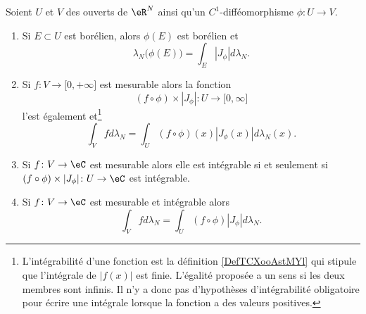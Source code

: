 \begin{theorem}
    Soient \( U\) et \( V\) des ouverts de \( \eR^N\) ainsi qu'un \( C^1\)-difféomorphisme \(\phi\colon U\to V\).
    \begin{enumerate}
        \item   \label{ItemVWYDooOzwnyfi}
            Si \( E\subset U\) est borélien, alors \( \phi(E)\) est borélien et
            \begin{equation}
                \lambda_N\big( \phi(E) \big)=\int_E| J_{\phi} |d\lambda_N.
            \end{equation}
        \item
            Si \( f\colon V\to \mathopen[ 0 , +\infty \mathclose]\) est mesurable alors la fonction
            \begin{equation}
                (f\circ\phi)\times | J_{\phi} |\colon U\to \mathopen[ 0 , \infty \mathclose]
            \end{equation}
            l'est également et\footnote{L'intégrabilité d'une fonction est la définition \ref{DefTCXooAstMYl} qui stipule que l'intégrale de \( | f(x) |\) est finie. L'égalité proposée a un sens si les deux membres sont infinis. Il n'y a donc pas d'hypothèses d'intégrabilité obligatoire pour écrire une intégrale lorsque la fonction a des valeurs positives.}
            \begin{equation}        \label{EqRANEooQsFhbC}
                \int_Vfd\lambda_N=\int_U(f\circ\phi)(x)| J_{\phi}(x) |d\lambda_N(x).
            \end{equation}
        \item
            Si \( f\colon V\to \eC\) est mesurable alors elle est intégrable si et seulement si \( (f\circ \phi)\times | J_{\phi} |\colon U\to \eC\) est intégrable.
        \item
            Si \( f\colon V\to \eC\) est mesurable et intégrable alors
            \begin{equation}
                \int_Vfd\lambda_N=\int_U (f\circ \phi)| J_{\phi} |d\lambda_N.
            \end{equation}
    \end{enumerate}
\end{theorem}

